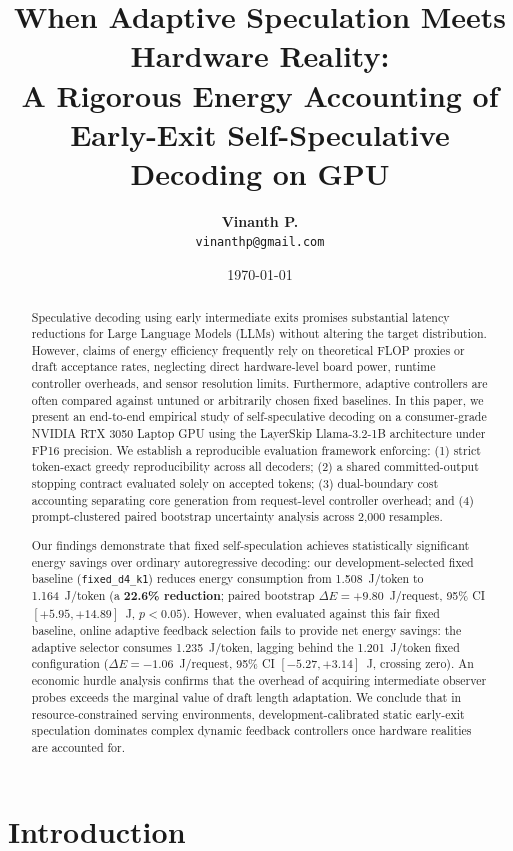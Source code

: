 \documentclass[10pt,twocolumn,letterpaper]{article}
\title{\textbf{When Adaptive Speculation Meets Hardware Reality:\\A Rigorous Energy Accounting of Early-Exit Self-Speculative Decoding on GPU}}
\author{
  \textbf{Vinanth P.}\\
  \texttt{vinanthp@gmail.com}
}
\date{\today}
\begin{document}
\maketitle

\begin{abstract}
Speculative decoding using early intermediate exits promises substantial latency reductions for Large Language Models (LLMs) without altering the target distribution. However, claims of energy efficiency frequently rely on theoretical FLOP proxies or draft acceptance rates, neglecting direct hardware-level board power, runtime controller overheads, and sensor resolution limits. Furthermore, adaptive controllers are often compared against untuned or arbitrarily chosen fixed baselines. In this paper, we present an end-to-end empirical study of self-speculative decoding on a consumer-grade NVIDIA RTX 3050 Laptop GPU using the LayerSkip Llama-3.2-1B architecture under FP16 precision. We establish a reproducible evaluation framework enforcing: (1) strict token-exact greedy reproducibility across all decoders; (2) a shared committed-output stopping contract evaluated solely on accepted tokens; (3) dual-boundary cost accounting separating core generation from request-level controller overhead; and (4) prompt-clustered paired bootstrap uncertainty analysis across 2,000 resamples.

Our findings demonstrate that fixed self-speculation achieves statistically significant energy savings over ordinary autoregressive decoding: our development-selected fixed baseline (\texttt{fixed\_d4\_k1}) reduces energy consumption from 1.508~J/token to 1.164~J/token (a \textbf{22.6\% reduction}; paired bootstrap $\Delta E = +9.80$~J/request, 95\% CI $[+5.95, +14.89]$~J, $p < 0.05$). However, when evaluated against this fair fixed baseline, online adaptive feedback selection fails to provide net energy savings: the adaptive selector consumes 1.235~J/token, lagging behind the 1.201~J/token fixed configuration ($\Delta E = -1.06$~J/request, 95\% CI $[-5.27, +3.14]$~J, crossing zero). An economic hurdle analysis confirms that the overhead of acquiring intermediate observer probes exceeds the marginal value of draft length adaptation. We conclude that in resource-constrained serving environments, development-calibrated static early-exit speculation dominates complex dynamic feedback controllers once hardware realities are accounted for.
\end{abstract}

\section{Introduction}
\end{document}
